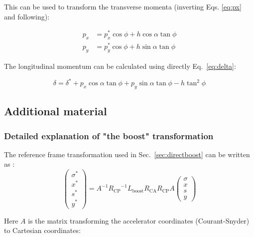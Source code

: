 This can be used to transform the transverse momenta (inverting Eqs. \ref{eq:px} and following):

\begin{align}
p_x &= p_x^* \cos \phi + h \cos \alpha \tan \phi\\
p_y &= p_y^* \cos \phi + h \sin \alpha \tan \phi
\end{align}

The longitudinal momentum can be calculated using directly Eq.~\ref{eq:delta}:

\begin{equation}
\delta = \delta^* + p_x \cos \alpha \tan \phi + p_y \sin \alpha \tan \phi - h \tan^2 \phi
\end{equation}

\subsection{Additional material}



\subsubsection{Detailed explanation of "the boost" transformation}
\label{app:boost}
The reference frame transformation used in Sec.~\ref{sec:directboost} can be written as \cite{hirata, beam_beam}:
\begin{equation}
\left( \begin{matrix}
\sigma^*\\
x^*\\
s^*\\
y^*
\end{matrix} \right) = A^{-1}{R_{\mathrm{CP}}}^{-1}L_{\mathrm{boost}}R_{\mathrm{CA}}R_{\mathrm{CP}}A
\left( \begin{matrix}
\sigma\\
x\\
s\\
y
\end{matrix} \right) 
\end{equation}

Here $A$ is the matrix transforming the accelerator coordinates (Courant-Snyder) to Cartesian coordinates:

